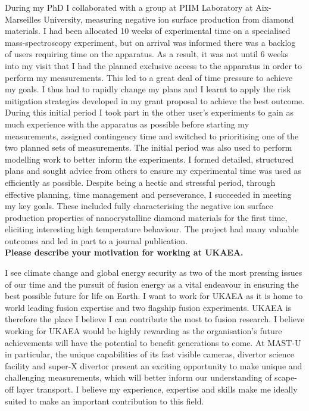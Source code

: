 \documentclass[11pt,a4paper,sans]{moderncv}        %
\begin{document}
During my PhD I collaborated with a group at PIIM Laboratory at Aix-Marseilles University, measuring negative ion surface production from diamond materials. I had been allocated 10 weeks of experimental time on a specialised mass-spectroscopy experiment, but on arrival was informed there was a backlog of users requiring time on the apparatus. As a result, it was not until 6 weeks into my visit that I had the planned exclusive access to the apparatus in order to perform my measurements. This led to a great deal of time pressure to achieve my goals. I thus had to rapidly change my plans and I learnt to apply the risk mitigation strategies developed in my grant proposal to achieve the best outcome. 
During this initial period I took part in the other user's experiments to gain as much experience with the apparatus as possible before starting my measurements, assigned contingency time and switched to prioritising one of the two planned sets of measurements. The initial period was also used to perform modelling work to better inform the experiments. I formed detailed, structured plans and sought advice from others to ensure my experimental time was used as efficiently as possible. Despite being a hectic and stressful period, through effective planning, time management and perseverance, I succeeded in meeting my key goals. These included fully characterising the negative ion surface production properties of nanocrystalline diamond materials for the first time, eliciting interesting high temperature behaviour. The project had many valuable outcomes and led in part to a journal publication.
\\

\textbf{Please describe your motivation for working at UKAEA.}

I see climate change and global energy security as two of the most pressing issues of our time and the pursuit of fusion energy as a vital endeavour in ensuring the best possible future for life on Earth. I want to work for UKAEA as it is home to world leading fusion expertise and two flagship fusion experiments. UKAEA is therefore the place I believe I can contribute the most to fusion research. I believe working for UKAEA would be highly rewarding as the organisation's future achievements will have the potential to benefit generations to come. At MAST-U in particular, the unique capabilities of its fast visible cameras, divertor science facility and super-X divertor present an exciting opportunity to make unique and challenging measurements, which will better inform our understanding of scape-off layer transport. I believe my experience, expertise and skills make me ideally suited to make an important contribution to this field.
\end{document}
